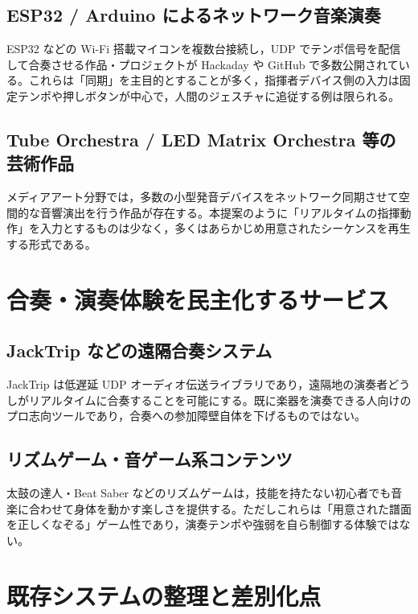 \subsection{ESP32 / Arduino によるネットワーク音楽演奏}

ESP32 などの Wi-Fi 搭載マイコンを複数台接続し，UDP でテンポ信号を配信して合奏させる作品・プロジェクトが Hackaday や GitHub で多数公開されている\cite{esp32_orchestra}。これらは「同期」を主目的とすることが多く，指揮者デバイス側の入力は固定テンポや押しボタンが中心で，人間のジェスチャに追従する例は限られる。

\subsection{Tube Orchestra / LED Matrix Orchestra 等の芸術作品}

メディアアート分野では，多数の小型発音デバイスをネットワーク同期させて空間的な音響演出を行う作品が存在する\cite{media_art_orchestra}。本提案のように「リアルタイムの指揮動作」を入力とするものは少なく，多くはあらかじめ用意されたシーケンスを再生する形式である。

\section{合奏・演奏体験を民主化するサービス}

\subsection{JackTrip などの遠隔合奏システム}

JackTrip は低遅延 UDP オーディオ伝送ライブラリであり，遠隔地の演奏者どうしがリアルタイムに合奏することを可能にする\cite{jacktrip}。既に楽器を演奏できる人向けのプロ志向ツールであり，合奏への参加障壁自体を下げるものではない。

\subsection{リズムゲーム・音ゲーム系コンテンツ}

太鼓の達人・Beat Saber などのリズムゲームは，技能を持たない初心者でも音楽に合わせて身体を動かす楽しさを提供する\cite{rhythm_games}。ただしこれらは「用意された譜面を正しくなぞる」ゲーム性であり，演奏テンポや強弱を自ら制御する体験ではない。

\section{既存システムの整理と差別化点}
\label{sec:differentiation}

